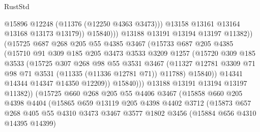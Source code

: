 \begin{lexlean}{RustStd}
\begin{coremodule}
{\begin{coremodule}
{{{{{{{{{{{{{{{{{{{{{{{{{{{{{{{{{{{{{{{{{{{{{{{{{{{{{{{{{{{{{{{{{{{{{{{{{{{{{{{{{{{{{                                @15896
                                @12248
                                (@11376 (@12250 @4363 @3473)))
                              @13158
                              @13161
                              @13164
                              @13168
                              @13173
                              @13179))
                          @15840)))
                    @13188
                    @13191
                    @13194
                    @13197
                    @11382))
                (@15725
                  @687
                  @268
                  @205
                  @55
                  @4385
                  @3467
                  (@15733
                    @687
                    @205
                    @4385
                    (@15710
                      @91
                      @309
                      @185
                      @205
                      @3473
                      @3533
                      @3209
                      @1257
                      (@15720
                        @309
                        @185
                        @3533
                        (@15725
                          @307
                          @268
                          @98
                          @55
                          @3531
                          @3467
                          (@11327
                            @12781
                            @3309
                            @71
                            @98
                            @71
                            @3531
                            (@11335 (@11336 @12781 @71))
                            @11788)
                          @15840))
                      @14341
                      @14344
                      @14347
                      @14350
                      @12209))
                  @15840)))
            @13188
            @13191
            @13194
            @13197
            @11382))
        (@15725
          @660
          @268
          @205
          @55
          @4406
          @3467
          (@15858
            @660
            @205
            @4398
            @4404
            (@15865
              @659
              @13119
              @205
              @4398
              @4402
              @3712
              (@15873
                @657
                @268
                @405
                @55
                @4310
                @3473
                @3467
                @3577
                @1802
                @3456
                (@15884 @656 @4310 @14395 @14399)
}}}}}}}}}}}}}}}}}}}}}}}}}}}}}}}}}}}}}}}}}}}}}}}}}}}}}}}}}}}}}}}}}}}}}}}}}}}}}}}}}}}}}
\end{coremodule}}
\end{coremodule}
\end{lexlean}

